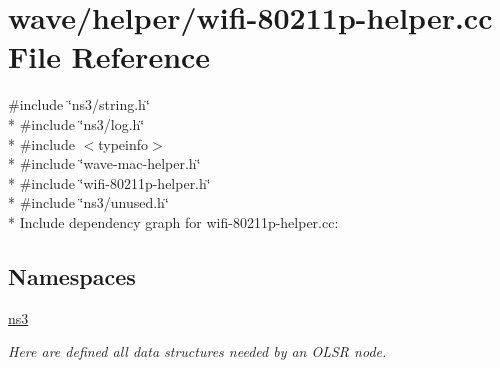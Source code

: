 \hypertarget{wifi-80211p-helper_8cc}{}\section{wave/helper/wifi-\/80211p-\/helper.cc File Reference}
\label{wifi-80211p-helper_8cc}
{\ttfamily \#include \char`\"{}ns3/string.\+h\char`\"{}}\\*
{\ttfamily \#include \char`\"{}ns3/log.\+h\char`\"{}}\\*
{\ttfamily \#include $<$typeinfo$>$}\\*
{\ttfamily \#include \char`\"{}wave-\/mac-\/helper.\+h\char`\"{}}\\*
{\ttfamily \#include \char`\"{}wifi-\/80211p-\/helper.\+h\char`\"{}}\\*
{\ttfamily \#include \char`\"{}ns3/unused.\+h\char`\"{}}\\*
Include dependency graph for wifi-\/80211p-\/helper.cc\+:
\subsection*{Namespaces}
\begin{DoxyCompactItemize}
\item 
 \hyperlink{namespacens3}{ns3}
\begin{DoxyCompactList}\small\item\em Here are defined all data structures needed by an O\+L\+SR node. \end{DoxyCompactList}\end{DoxyCompactItemize}
